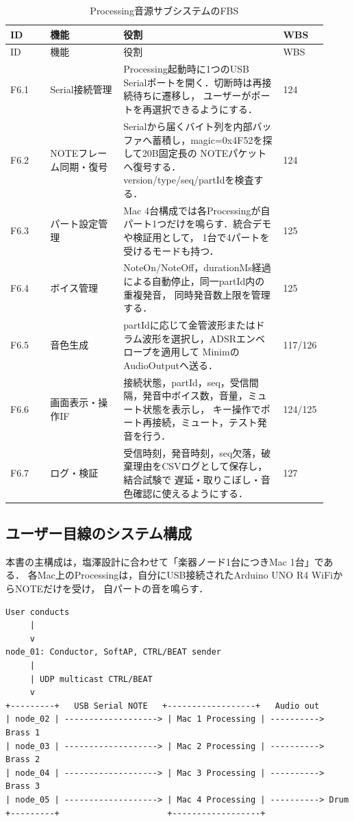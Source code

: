 \documentclass[a4paper,11pt]{jsarticle}
\begin{document}
\begin{longtable}{p{0.12\linewidth}p{0.22\linewidth}p{0.48\linewidth}p{0.10\linewidth}}
\caption{Processing音源サブシステムのFBS}\label{tab:fbs}\\
\toprule
ID & 機能 & 役割 & WBS \\
\midrule
\endfirsthead
\toprule
ID & 機能 & 役割 & WBS \\
\midrule
\endhead
F6.1 & Serial接続管理 &
Processing起動時に1つのUSB Serialポートを開く．切断時は再接続待ちに遷移し，
ユーザーがポートを再選択できるようにする． & 124 \\
F6.2 & NOTEフレーム同期・復号 &
Serialから届くバイト列を内部バッファへ蓄積し，magic=0x4F52を探して20B固定長の
NOTEパケットへ復号する．version/type/seq/partIdを検査する． & 124 \\
F6.3 & パート設定管理 &
Mac 4台構成では各Processingが自パート1つだけを鳴らす．統合デモや検証用として，
1台で4パートを受けるモードも持つ． & 125 \\
F6.4 & ボイス管理 &
NoteOn/NoteOff，durationMs経過による自動停止，同一partId内の重複発音，
同時発音数上限を管理する． & 125 \\
F6.5 & 音色生成 &
partIdに応じて金管波形またはドラム波形を選択し，ADSRエンベロープを適用して
MinimのAudioOutputへ送る． & 117/126 \\
F6.6 & 画面表示・操作IF &
接続状態，partId，seq，受信間隔，発音中ボイス数，音量，ミュート状態を表示し，
キー操作でポート再接続，ミュート，テスト発音を行う． & 124/125 \\
F6.7 & ログ・検証 &
受信時刻，発音時刻，seq欠落，破棄理由をCSVログとして保存し，結合試験で
遅延・取りこぼし・音色確認に使えるようにする． & 127 \\
\bottomrule
\end{longtable}

\subsection{ユーザー目線のシステム構成}

本書の主構成は，塩澤設計に合わせて「楽器ノード1台につきMac 1台」である．
各Mac上のProcessingは，自分にUSB接続されたArduino UNO R4 WiFiからNOTEだけを受け，
自パートの音を鳴らす．

\begin{lstlisting}[style=textdiagram, caption={Processing音源サブシステムを含む全体構成}]
User conducts
     |
     v
node_01: Conductor, SoftAP, CTRL/BEAT sender
     |
     | UDP multicast CTRL/BEAT
     v
+---------+   USB Serial NOTE   +------------------+   Audio out
| node_02 | -------------------> | Mac 1 Processing | ----------> Brass 1
| node_03 | -------------------> | Mac 2 Processing | ----------> Brass 2
| node_04 | -------------------> | Mac 3 Processing | ----------> Brass 3
| node_05 | -------------------> | Mac 4 Processing | ----------> Drum
+---------+                      +------------------+
\end{lstlisting}
\end{document}
